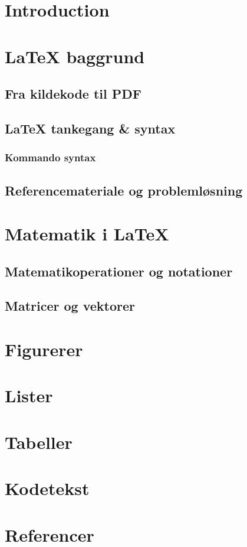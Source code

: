 
\section{Introduction}

\section{\LaTeX{} baggrund}

 \subsection{Fra kildekode til PDF}\label{sec:local}

 \subsection{\LaTeX{} tankegang \& syntax}

   \subsubsection{Kommando syntax}

 \subsection{Referencemateriale og problemløsning}

\section{Matematik i \LaTeX}

 \subsection{Matematikoperationer og notationer}

 \subsection{Matricer og vektorer}

\section{Figurerer}

\section{Lister}

\section{Tabeller}


\section{Kodetekst}

\section{Referencer}
